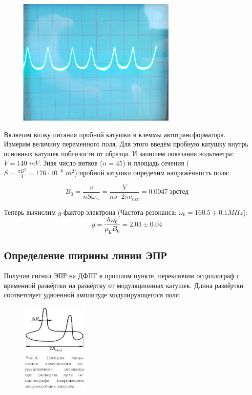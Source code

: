 \documentclass{article}
\begin{document}
\begin{figure}[H]
	\centering
	\includegraphics[width=0.7\textwidth]{Peaks.jpeg}
\end{figure}

Включим вилку питания пробной катушки в клеммы автотрансформатора. Измерим величину переменного поля. 
Для этого введём пробную катушку внутрь основных катушек поблизости от образца. И запишем показания
вольтметра: \(V = 140\; mV\). Зная число витков (\(n = 45\)) и площадь сечения 
(\(S = \frac{\pi D^2}{4} = 176\cdot 10^{-6}\; m^2 \)) пробной катушки определим напряжённость поля:

\[B_0 = \frac{v}{nS\omega_{\simeq}} = \frac{V}{ns \cdot 2\pi\nu_{net}} = 0.0047\;\text{эрстед}\]

Теперь вычислим \(g\)-фактор электрона (Частота резонанса: \(\omega_0 = 160.5 \pm 0.1 MHz\)):
\[ g = \frac{\hbar\omega_0}{\mu_{\text{Б}}B_0} = 2.03 \pm 0.04 \]

\subsection{Определение ширины линии ЭПР}
Получив сигнал ЭПР на ДФПГ в прошлом пункте, переключим осциллограф с временной развёртки на развёртку
от модуляционных катушек. Длина развёртки соответсвует удвоенной амплитуде модулирующегося поля:

\begin{figure}[H]
	\centering
	\includegraphics[width=0.3\textwidth]{2B.png}
\end{figure}
\end{document}
